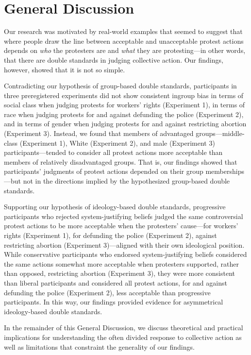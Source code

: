 \documentclass[12pt, letterpaper]{article}
\begin{document}
\hypertarget{general-discussion}{%
\section{General Discussion}\label{general-discussion}}

Our research was motivated by real-world examples that seemed to suggest
that where people draw the line between acceptable and unacceptable
protest actions depends on \emph{who} the protesters are and \emph{what}
they are protesting---in other words, that there are double standards in
judging collective action. Our findings, however, showed that it is not
so simple.

Contradicting our hypothesis of group-based double standards,
participants in three preregistered experiments did not show consistent
ingroup bias in terms of social class when judging protests for workers'
rights (Experiment 1), in terms of race when judging protests for and
against defunding the police (Experiment 2), and in terms of gender when
judging protests for and against restricting abortion (Experiment 3).
Instead, we found that members of advantaged groups---middle-class
(Experiment 1), White (Experiment 2), and male (Experiment 3)
participants---tended to consider all protest actions more acceptable
than members of relatively disadvantaged groups. That is, our findings
showed that participants' judgments of protest actions depended on their
group memberships---but not in the directions implied by the
hypothesized group-based double standards.

Supporting our hypothesis of ideology-based double standards,
progressive participants who rejected system-justifying beliefs judged
the same controversial protest actions to be more acceptable when the
protesters' cause---for workers' rights (Experiment 1), for defunding
the police (Experiment 2), against restricting abortion (Experiment
3)---aligned with their own ideological position. While conservative
participants who endorsed system-justifying beliefs considered the same
actions somewhat more acceptable when protesters supported, rather than
opposed, restricting abortion (Experiment 3), they were more consistent
than liberal participants and considered all protest actions, for and
against defunding the police (Experiment 2), less acceptable than
progressive participants. In this way, our findings provided evidence
for asymmetrical ideology-based double standards.

In the remainder of this General Discussion, we discuss theoretical and
practical implications for understanding the often divided response to
collective action as well as limitations that constraint the generality
of our findings.
\end{document}

